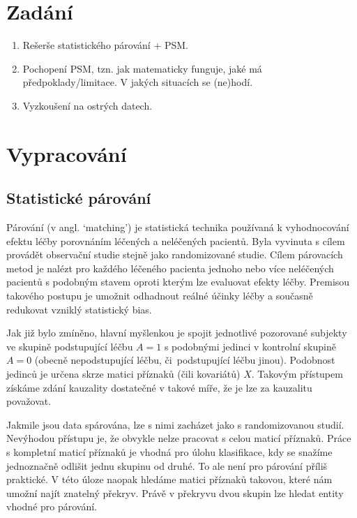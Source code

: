 \section{Zadání}

\begin{enumerate}
    \item Rešerše statistického párování + PSM.
    \item Pochopení PSM, tzn. jak matematicky funguje, jaké má předpoklady/limitace. V jakých situacích se (ne)hodí.
    \item Vyzkoušení na ostrých datech.
\end{enumerate}

\section{Vypracování}

\subsection{Statistické párování}

Párování (v angl. \enquote*{matching}) je statistická technika používaná k vyhodnocování efektu léčby porovnáním léčených a neléčených pacientů.
Byla vyvinuta s cílem provádět observační studie stejně jako randomizované studie.
Cílem párovacích metod je nalézt pro každého léčeného pacienta jednoho nebo více neléčených pacientů s podobným stavem oproti kterým lze evaluovat efekty léčby.
Premisou takového postupu je umožnit odhadnout reálné účinky léčby a současně redukovat vzniklý statistický bias.

Jak již bylo zmíněno, hlavní myšlenkou je spojit jednotlivé pozorované subjekty ve skupině podstupující léčbu \( A = 1 \) s podobnými jedinci v kontrolní skupině \( A = 0 \) (obecně nepodstupující léčbu, či~podstupující léčbu jinou).
Podobnost jedinců je určena skrze matici příznaků (čili kovariátů) \( X \).
Takovým přístupem získáme zdání kauzality dostatečné v takové míře, že je lze za kauzalitu považovat.

Jakmile jsou data spárována, lze s nimi zacházet jako s randomizovanou studií.
Nevýhodou přístupu je, že obvykle nelze pracovat s celou maticí příznaků.
Práce s kompletní maticí příznaků je vhodná pro úlohu klasifikace, kdy se snažíme jednoznačně odlišit jednu skupinu od druhé.
To ale není pro párování příliš praktické.
V této úloze naopak hledáme matici příznaků takovou, které nám umožní najít znatelný překryv.
Právě v překryvu dvou skupin lze hledat entity vhodné pro párování.

